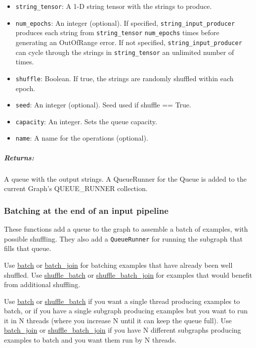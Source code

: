 \begin{itemize}
\tightlist
\item
  \texttt{string\_tensor}: A 1-D string tensor with the strings to
  produce.
\item
  \texttt{num\_epochs}: An integer (optional). If specified,
  \texttt{string\_input\_producer} produces each string from
  \texttt{string\_tensor} \texttt{num\_epochs} times before generating
  an OutOfRange error. If not specified,
  \texttt{string\_input\_producer} can cycle through the strings in
  \texttt{string\_tensor} an unlimited number of times.
\item
  \texttt{shuffle}: Boolean. If true, the strings are randomly shuffled
  within each epoch.
\item
  \texttt{seed}: An integer (optional). Seed used if shuffle == True.
\item
  \texttt{capacity}: An integer. Sets the queue capacity.
\item
  \texttt{name}: A name for the operations (optional).
\end{itemize}

\subparagraph{Returns: }\label{returns-53}

A queue with the output strings. A QueueRunner for the Queue is added to
the current Graph's QUEUE\_RUNNER collection.

\subsubsection{Batching at the end of an input pipeline
}\label{batching-at-the-end-of-an-input-pipeline}

These functions add a queue to the graph to assemble a batch of
examples, with possible shuffling. They also add a \texttt{QueueRunner}
for running the subgraph that fills that queue.

Use \protect\hyperlink{batch}{batch} or
\protect\hyperlink{batchux5fjoin}{batch\_join} for batching examples
that have already been well shuffled. Use
\protect\hyperlink{shuffleux5fbatch}{shuffle\_batch} or
\protect\hyperlink{shuffleux5fbatchux5fjoin}{shuffle\_batch\_join} for
examples that would benefit from additional shuffling.

Use \protect\hyperlink{batch}{batch} or
\protect\hyperlink{shuffleux5fbatch}{shuffle\_batch} if you want a
single thread producing examples to batch, or if you have a single
subgraph producing examples but you want to run it in N threads (where
you increase N until it can keep the queue full). Use
\protect\hyperlink{batchux5fjoin}{batch\_join} or
\protect\hyperlink{shuffleux5fbatchux5fjoin}{shuffle\_batch\_join} if
you have N different subgraphs producing examples to batch and you want
them run by N threads.


